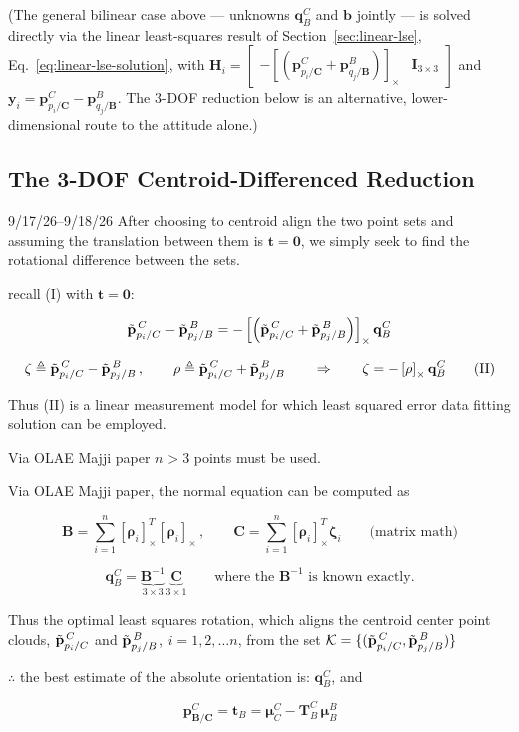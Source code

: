 \documentclass{article}
\newcommand{\vect}[1]{\mathbf{#1}}
\newcommand{\mat}[1]{\mathbf{#1}}
\newcommand{\TCB}{\mat{T}^C_{B}}
\newcommand{\pBjB}{\vect{p}^{\mathit{B}}_{q_{j}/\mathbf{B}}}
\newcommand{\pCiC}{\vect{p}^{\mathit{C}}_{p_{i}/\mathbf{C}}}
\newcommand{\pBCC}{\vect{p}^{\mathit{C}}_{\mathbf{B}/\mathbf{C}}}
\newcommand{\Kmat}{\mat{K}} %
\newcommand{\corrSet}{\mathcal{K}} %
\newcommand{\skewop}[1]{\left[#1\right]_{\times}} %
\newcommand{\qCB}{\vect{q}^{C}_{B}} %
\newcommand{\tB}{\vect{t}_B} %
\newcommand{\muC}{\vect{\mu}^{C}_{C}} %
\newcommand{\muB}{\vect{\mu}^{B}_{B}} %
\newcommand{\pCt}{\Tilde{\vect{p}}^{\,C}_{p_i/C}} %
\newcommand{\pBt}{\Tilde{\vect{p}}^{\,B}_{p_j/B}} %
\newcommand{\zetaVec}{\vect{\zeta}} %
\newcommand{\rhoVec}{\vect{\rho}} %
\newcommand{\bvec}{\vect{b}} %
\begin{document}
\noindent (The general bilinear case above --- unknowns $\qCB$ and $\bvec$ jointly --- is solved directly via the linear least-squares result of Section~\ref{sec:linear-lse}, Eq.~\eqref{eq:linear-lse-solution}, with $\mat{H}_i = \begin{bmatrix} -\skewop{\left(\pCiC+\pBjB\right)} & \mat{I}_{3\times3} \end{bmatrix}$ and $\vect{y}_i = \pCiC - \pBjB$. The 3-DOF reduction below is an alternative, lower-dimensional route to the attitude alone.)

\subsection{The 3-DOF Centroid-Differenced Reduction}

\begin{authornotes}{9/17/26--9/18/26}
After choosing to centroid align the two point sets and assuming the translation between them is $\vect{t} = \vect{0}$, we simply seek to find the rotational difference between the sets.

recall (I) with $\vect{t} = \vect{0}$:

\begin{equation}
    \pCt - \pBt = -\skewop{\left( \pCt + \pBt \right)} \qCB
\end{equation}

\begin{equation}
    \zetaVec \triangleq \pCt - \pBt \, , \qquad \rhoVec \triangleq \pCt + \pBt \qquad \Rightarrow \qquad \zetaVec = -\skewop{\rhoVec} \qCB \tag{II}
\end{equation}

Thus (II) is a linear measurement model for which least squared error data fitting solution can be employed.

Via OLAE Majji paper $n > 3$ points must be used.

Via OLAE Majji paper, the normal equation can be computed as

\begin{equation}
    \mat{B} = \sum_{i=1}^{n} \skewop{\rhoVec_i}^T \skewop{\rhoVec_i} \, , \qquad \vect{C} = \sum_{i=1}^{n} \skewop{\rhoVec_i}^T \zetaVec_i \qquad \text{(matrix math)}
\end{equation}

\begin{equation}
    \qCB = \underbrace{\mat{B}^{-1}}_{3\times 3} \underbrace{\vect{C}}_{3 \times 1} \qquad \text{where the } \mat{B}^{-1} \text{ is known exactly.}
\end{equation}

Thus the optimal least squares rotation, which aligns the centroid center point clouds, $\pCt$ and $\pBt$, $i = 1, 2, \dots n$, from the set $\corrSet = \{ (\pCt, \pBt) \}$

$\therefore$ the best estimate of the absolute orientation is: $\qCB$, and

\begin{equation}
    \pBCC = \tB = \muC - \TCB \, \muB
\end{equation}
\end{authornotes}
\end{document}
